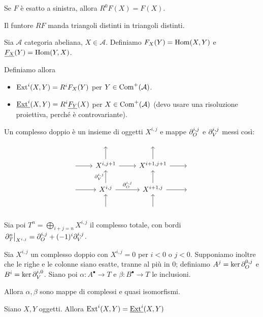 \begin{oss}
    Se $F$ è esatto a sinistra, allora $R^0F(X)=F(X)$.
\end{oss}

\begin{proposition}
    Il funtore $RF$ manda triangoli distinti in triangoli distinti.
\end{proposition}


\begin{definition}
    Sia $\mathcal A$ categoria abeliana, $X\in\mathcal A$. Definiamo $F_X(Y)=\operatorname{Hom}(X,Y)$ e $\underline{F_X}(Y)=\operatorname{Hom}(Y,X)$.
    
    Definiamo allora
    \begin{itemize}
        \item $\operatorname{Ext}^i(X,Y)=R^iF_X(Y)$ per $Y\in\operatorname{Com}^+(\mathcal A)$.
        \item $\underline{\operatorname{Ext}^i}(X,Y)=R^i\underline{F_Y}(X)$ per $X\in\operatorname{Com}^+(\mathcal A)$ (devo usare una risoluzione proiettiva, perché è controvariante).
    \end{itemize}
\end{definition}


\begin{definition}
    Un complesso doppio è un insieme di oggetti $X^{i,j}$ e mappe $\partial_O^{i,j}$ e $\partial_V^{i,j}$ messi così:
    $$\begin{tikzcd}
    & \, & \, &  \\
    \ar[r] &  X^{i,j+1} \ar[u] \ar[r] & X^{i+1,j+1} \ar[r] \ar[u] &  \, \\
    \ar[r] &  X^{i,j} \ar[u, "\de_V^{i,j}"] \ar[r, "\de_O^{i,j}"] & X^{i+1,j} \ar[r] \ar[u] &  \,  \\
    & \ar[u] & \ar[u] & 
    \end{tikzcd}$$
    
    Sia poi $T^n=\bigoplus_{i+j=n}X^{i,j}$ il complesso totale, con bordi $\left. \partial_T^n \right|_{X^{i,j}}=\partial_O^{i,j}+(-1)^i\partial_V^{i,j}$.
\end{definition}

\begin{proposition}
    Sia $X^{i,j}$ un complesso doppio con $X^{i,j}=0$ per $i<0$ o $j<0$. Supponiamo inoltre che le righe e le colonne siano esatte, tranne al più in $0$; definiamo $A^j=\ker\partial_O^{0,j}$ e $B^i=\ker\partial_V^{i,0}$.
    Siano poi $\alpha:A^\bullet\to T$ e $\beta:B^\bullet\to T$ le inclusioni.
    
    Allora $\alpha,\beta$ sono mappe di complessi e quasi isomorfismi.
\end{proposition}

\begin{proposition}
    Siano $X,Y$ oggetti. Allora $\operatorname{Ext}^i(X,Y)=\underline{\operatorname{Ext}^i}(X,Y)$
\end{proposition}



